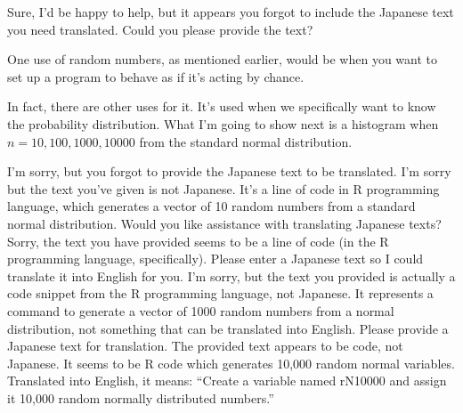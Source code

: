 \documentclass[
  a4paper,
]{book}
\begin{document}
Sure, I'd be happy to help, but it appears you forgot to include the
Japanese text you need translated. Could you please provide the text?

One use of random numbers, as mentioned earlier, would be when you want
to set up a program to behave as if it's acting by chance.

In fact, there are other uses for it. It's used when we specifically
want to know the probability distribution. What I'm going to show next
is a histogram when \(n = 10,100,1000,10000\) from the standard normal
distribution.

I'm sorry, but you forgot to provide the Japanese text to be translated.
I'm sorry but the text you've given is not Japanese. It's a line of code
in R programming language, which generates a vector of 10 random numbers
from a standard normal distribution. Would you like assistance with
translating Japanese texts? Sorry, the text you have provided seems to
be a line of code (in the R programming language, specifically). Please
enter a Japanese text so I could translate it into English for you. I'm
sorry, but the text you provided is actually a code snippet from the R
programming language, not Japanese. It represents a command to generate
a vector of 1000 random numbers from a normal distribution, not
something that can be translated into English. Please provide a Japanese
text for translation. The provided text appears to be code, not
Japanese. It seems to be R code which generates 10,000 random normal
variables. Translated into English, it means: ``Create a variable named
rN10000 and assign it 10,000 random normally distributed numbers.''
\end{document}
